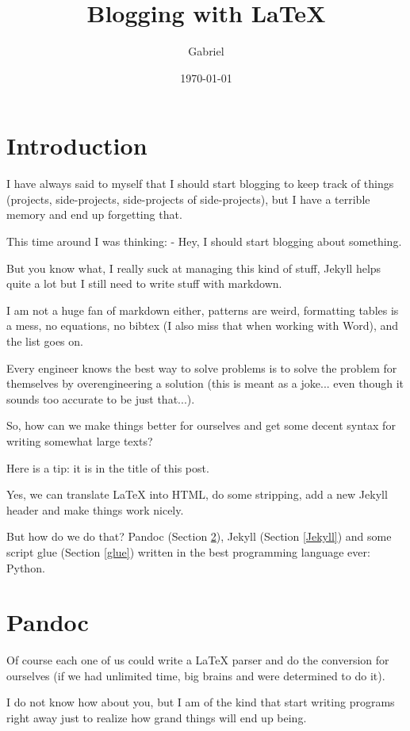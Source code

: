 \documentclass{article}
\title{Blogging with LaTeX}
\author{Gabriel}
\date{\today}
\begin{document}
\maketitle

\begin{abstract}
\end{abstract}

\section{Introduction}
I have always said to myself that I should start blogging to keep track of things (projects, side-projects,
side-projects of side-projects), but I have a terrible memory and end up forgetting that.

This time around I was thinking: - Hey, I should start blogging about something.

But you know what, I really suck at managing this kind of stuff, Jekyll helps quite a lot but I still need
to write stuff with markdown.

I am not a huge fan of markdown either, patterns are weird, formatting tables is a mess, no equations, no bibtex
(I also miss that when working with Word), and the list goes on.

Every engineer knows the best way to solve problems is to solve the problem for themselves by overengineering
a solution (this is meant as a joke... even though it sounds too accurate to be just that...).

So, how can we make things better for ourselves and get some decent syntax for writing somewhat large texts?

Here is a tip: it is in the title of this post.

Yes, we can translate LaTeX into HTML, do some stripping, add a new Jekyll header and make things work nicely.

But how do we do that? Pandoc (Section \ref{Pandoc}), Jekyll (Section \ref{Jekyll}) and some script glue
(Section \ref{glue}) written in the best programming language ever: Python.

\section{Pandoc} \label{Pandoc}
Of course each one of us could write a LaTeX parser and do the conversion for ourselves (if we had unlimited time,
big brains and were determined to do it).

I do not know how about you, but I am of the kind that start writing programs right away just to realize how grand
things will end up being.
\end{document}
